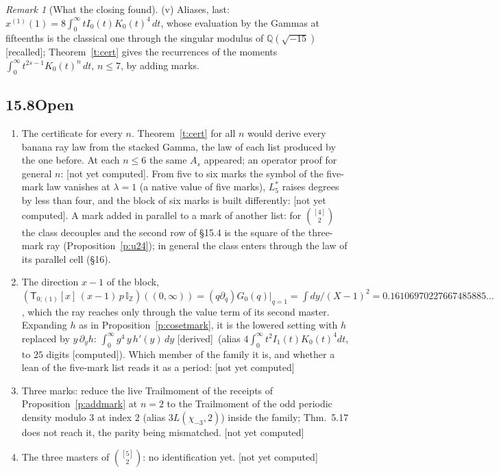 \documentclass[11pt]{article}
\newcommand{\sT}{\mathsf T}
\newcommand{\IZ}{\mathbb I_{\mathbb Z}}
\newcommand{\Tx}[3]{(\sT_{#1;(1)}[x]\,#2)((#3,\infty))}
\theoremstyle{plain}
\theoremstyle{definition}
\theoremstyle{remark}
\newtheorem{remark}[proposition]{Remark}
\newcommand{\derived}{\textup{[derived]}}
\newcommand{\computed}{\textup{[computed]}}
\newcommand{\recalled}{\textup{[recalled]}}
\newcommand{\notyet}{\textup{[not yet computed]}}
\begin{document}
\begin{remark}[What the closing found]
(v) Aliases, last: $x^{(1)}(1)=8\int_0^\infty tI_0(t)K_0(t)^4\,dt$, whose evaluation by the Gammas at fifteenths is the classical one through the singular modulus of $\mathbb Q(\sqrt{-15})$ \recalled; Theorem~\ref{t:cert} gives the recurrences of the moments $\int_0^\infty t^{2s-1}K_0(t)^n\,dt$, $n\le7$, by adding marks.
\end{remark}

\subsection*{15.8\quad Open}

\begin{enumerate}[label=(\roman*)]
\item The certificate for every $n$. Theorem~\ref{t:cert} for all $n$ would derive every banana ray law from the stacked Gamma, the law of each list produced by the one before. At each $n\le6$ the same $A_s$ appeared; an operator proof for general $n$: \notyet. From five to six marks the symbol of the five-mark law vanishes at $\lambda=1$ (a native value of five marks), $L_5^\ast$ raises degrees by less than four, and the block of six marks is built differently: \notyet. A mark added in parallel to a mark of another list: for $\binom{[4]}2$ the class decouples and the second row of \S15.4 is the square of the three-mark ray (Proposition~\ref{p:u24}); in general the class enters through the law of its parallel cell (\S16).
\item The direction $x-1$ of the block, $\Tx{0}{(x-1)\,p\,\IZ}{0}=(q\partial_q)G_0(q)|_{q=1}=\int dy/(X-1)^2=0.16106970227667485885\ldots$, which the ray reaches only through the value term of its second master. Expanding $h$ as in Proposition~\ref{p:cosetmark}, it is the lowered setting with $h$ replaced by $y\,\partial_yh$: $\int_0^\infty g^4\,y\,h'(y)\,dy$ \derived\ (alias $4\int_0^\infty t^2I_1(t)K_0(t)^4dt$, to $25$ digits \computed). Which member of the family it is, and whether a lean of the five-mark list reads it as a period: \notyet
\item Three marks: reduce the live Trailmoment of the receipts of Proposition~\ref{p:addmark} at $n=2$ to the Trailmoment of the odd periodic density modulo $3$ at index $2$ (alias $3L(\chi_{-3},2)$) inside the family; Thm.~5.17 does not reach it, the parity being mismatched. \notyet
\item The three masters of $\binom{[5]}2$: no identification yet. \notyet

\end{enumerate}
\end{document}
